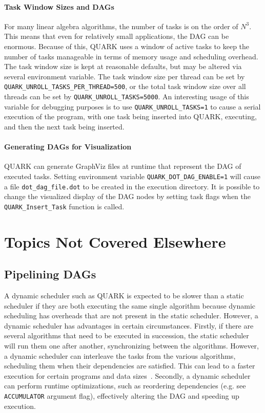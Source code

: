 \documentclass[11pt,letterpaper]{report}
\begin{document}
\paragraph{Task Window Sizes and DAGs}
For many linear algebra algorithms, the number of tasks is on the
order of $N^3$.  This means that even for relatively small
applications, the DAG can be enormous.  Because of this, QUARK uses a
window of active tasks to keep the number of tasks manageable in terms
of memory usage and scheduling overhead.  The task window size is kept
at reasonable defaults, but may be altered via several environment
variable. The task window size per thread can be set by
\verb|QUARK_UNROLL_TASKS_PER_THREAD=500|, or the total task window
size over all threads can be set by \verb|QUARK_UNROLL_TASKS=5000|.  An
interesting usage of this variable for debugging purposes is to use
\verb|QUARK_UNROLL_TASKS=1| to cause a serial execution of the
program, with one task being inserted into QUARK, executing, and then
the next task being inserted.

\paragraph{Generating DAGs for Visualization}
QUARK can generate GraphViz \cite{Ellson:2002:Graphviz-Open} files at
runtime that represent the DAG of executed tasks.  Setting environment
variable \verb|QUARK_DOT_DAG_ENABLE=1| will cause a file
\verb|dot_dag_file.dot| to be created in the execution directory.  It
is possible to change the visualized display of the DAG nodes by
setting task flags when the \verb|QUARK_Insert_Task| function is
called.


\section{Topics Not Covered Elsewhere}

\subsection{Pipelining DAGs}
A dynamic scheduler such as QUARK is expected to be slower than a
static scheduler if they are both executing the same single algorithm
because dynamic scheduling has overheads that are not present in the
static scheduler.  However, a dynamic scheduler has advantages in
certain circumstances.  Firstly, if there are several algorithms that
need to be executed in succession, the static scheduler will run them
one after another, synchronizing between the algorithms.  However, a
dynamic scheduler can interleave the tasks from the various
algorithms, scheduling them when their dependencies are satisfied.
This can lead to a faster execution for certain programs and data
sizes~\cite{Agullo:2011:Towards-an-Efficient}.  Secondly, a dynamic
scheduler can perform runtime optimizations, such as reordering
dependencies (e.g. see \verb|ACCUMULATOR| argument flag), effectively
altering the DAG and speeding up execution.
\end{document}
